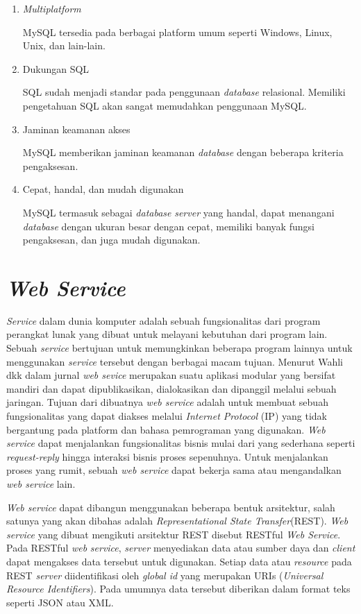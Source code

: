 \begin{enumerate}

	\item \textit{Multiplatform}

	MySQL tersedia pada berbagai platform umum seperti Windows, Linux, Unix, dan lain-lain.

	\item Dukungan SQL

	SQL sudah menjadi standar pada penggunaan \textit{database} relasional. Memiliki pengetahuan SQL akan sangat memudahkan penggunaan MySQL.

	\item Jaminan keamanan akses

	MySQL memberikan jaminan keamanan \textit{database} dengan beberapa kriteria pengaksesan.

	\item Cepat, handal, dan mudah digunakan

	MySQL termasuk sebagai \textit{database} \textit{server} yang handal, dapat menangani \textit{database} dengan ukuran besar dengan cepat, memiliki banyak fungsi pengaksesan, dan juga mudah digunakan.
\end{enumerate}

\section{\textit{Web Service}}

	\textit{Service} dalam dunia komputer adalah sebuah fungsionalitas dari program perangkat lunak yang dibuat untuk melayani kebutuhan dari program lain. Sebuah \textit{service} bertujuan untuk memungkinkan beberapa program lainnya untuk menggunakan \textit{service} tersebut dengan berbagai macam tujuan.  Menurut Wahli dkk dalam jurnal \cite{Fauziah2013} \textit{web sevice} merupakan suatu aplikasi modular yang bersifat mandiri dan dapat dipublikasikan, dialokasikan dan dipanggil melalui sebuah jaringan. Tujuan dari dibuatnya \textit{web service} adalah untuk membuat sebuah fungsionalitas yang dapat diakses melalui \textit{Internet Protocol} (IP) yang tidak bergantung pada platform dan bahasa pemrograman yang digunakan. \textit{Web service} dapat menjalankan fungsionalitas bisnis mulai dari yang sederhana seperti \textit{request-reply} hingga interaksi bisnis proses sepenuhnya. Untuk menjalankan proses yang rumit, sebuah \textit{web service} dapat bekerja sama atau mengandalkan \textit{web service} lain.

	\textit{Web service} dapat dibangun menggunakan beberapa bentuk arsitektur, salah satunya yang akan dibahas adalah \textit{Representational State Transfer}(REST). \textit{Web service} yang dibuat mengikuti arsitektur REST disebut RESTful \textit{Web Service}. Pada RESTful \textit{web} \textit{service}, \textit{server} menyediakan data atau sumber daya dan \textit{client} dapat mengakses data tersebut untuk digunakan. Setiap data atau \textit{resource} pada REST \textit{server} diidentifikasi oleh \textit{global id} yang merupakan URIs (\textit{Universal Resource Identifiers}). Pada umumnya data tersebut diberikan dalam format teks seperti JSON atau XML.

